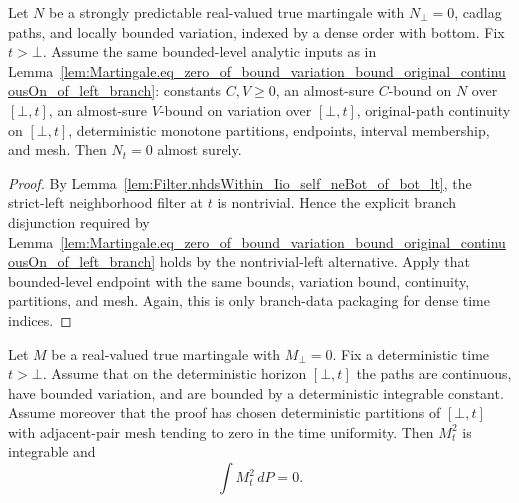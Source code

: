 \begin{lemma}\label{lem:Martingale.eq_zero_of_bound_variation_bound_original_continuousOn_of_dense_left}
Let \(N\) be a strongly predictable real-valued true martingale with
\(N_\bot=0\), cadlag paths, and locally bounded variation, indexed by a
dense order with bottom.  Fix \(t>\bot\).  Assume the same bounded-level
analytic inputs as in
Lemma~\ref{lem:Martingale.eq_zero_of_bound_variation_bound_original_continuousOn_of_left_branch}:
constants \(C,V\ge0\), an almost-sure \(C\)-bound on \(N\) over
\([\bot,t]\), an almost-sure \(V\)-bound on variation over \([\bot,t]\),
original-path continuity on \([\bot,t]\), deterministic monotone partitions,
endpoints, interval membership, and mesh.  Then \(N_t=0\) almost surely.
\end{lemma}

\begin{proof}
By Lemma~\ref{lem:Filter.nhdsWithin_Iio_self_neBot_of_bot_lt}, the
strict-left neighborhood filter at \(t\) is nontrivial.  Hence the explicit
branch disjunction required by
Lemma~\ref{lem:Martingale.eq_zero_of_bound_variation_bound_original_continuousOn_of_left_branch}
holds by the nontrivial-left alternative.  Apply that bounded-level endpoint
with the same bounds, variation bound, continuity, partitions, and mesh.
Again, this is only branch-data packaging for dense time indices.
\end{proof}

\begin{lemma}\label{lem:Martingale.integral_sq_terminal_eq_zero_of_bounded_continuous_finiteVariation}
Let \(M\) be a real-valued true martingale with \(M_\bot=0\).  Fix a
deterministic time \(t>\bot\).  Assume that on the deterministic horizon
\([\bot,t]\) the paths are continuous, have bounded variation, and are bounded
by a deterministic integrable constant.  Assume moreover that the proof has
chosen deterministic partitions of \([\bot,t]\) with adjacent-pair mesh tending
to zero in the time uniformity.  Then \(M_t^2\) is integrable and
\[
  \int M_t^2\,dP=0 .
\]
\end{lemma}

